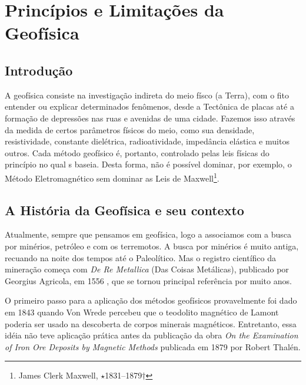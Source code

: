 \documentclass[0000]{subfiles}
\begin{document}
\chapter{Princ\'ipios e Limita\c{c}\~oes da Geof\'isica}

	\section{Introdu\c{c}\~ao}
A geof\'isica consiste na investiga\c{c}\~ao indireta do meio f\'isco (a Terra), com o fito entender ou explicar determinados fen\^omenos, desde a Tect\^onica de placas at\'e a forma\c{c}\~ao de depress\~oes nas ruas e avenidas de uma cidade.
Fazemos isso atrav\'es da medida de certos par\^ametros f\'isicos do meio, como sua densidade, resistividade, constante diel\'etrica, radioatividade, imped\^ancia el\'astica e muitos outros.
Cada m\'etodo geof\'isico \'e, portanto, controlado pelas leis f\'isicas do princ\'ipio no qual s baseia. Desta forma, n\~ao \'e poss\'ivel dominar, por exemplo, o M\'etodo Eletromagn\'etico sem dominar as Leis de Maxwell\footnote{James Clerk Maxwell, $\star$1831--1879$\dagger$}.

	\section{A Hist\'oria da Geof\'isica e seu contexto}
Atualmente, sempre que pensamos em geof\'isica, logo a associamos com a busca por min\'erios, petr\'oleo e com os terremotos.
A busca por min\'erios \'e muito antiga, recuando na noite dos tempos at\'e o Paleol\'itico.
Mas o registro cient\'ifico da minera\c{c}\~ao come\c{c}a com \emph{De Re Metallica} (Das Coisas Met\'alicas), publicado por Georgius Agricola, em 1556 \citep{telford_applied_1990}, que se tornou principal refer\^encia por muito anos.

O primeiro passo para a aplica\c{c}\~ao dos m\'etodos geof\'isicos provavelmente foi dado em 1843 quando Von Wrede percebeu que o teodolito magn\'etico de Lamont poderia ser usado na descoberta de corpos minerais magn\'eticos.
Entretanto, essa id\'eia n\~ao teve aplica\c{c}\~ao pr\'atica antes da publica\c{c}\~ao da obra \emph{On the Examination of Iron Ore Deposits by Magnetic Methods} publicada em 1879 por Robert Thal\'en.
\end{document}
